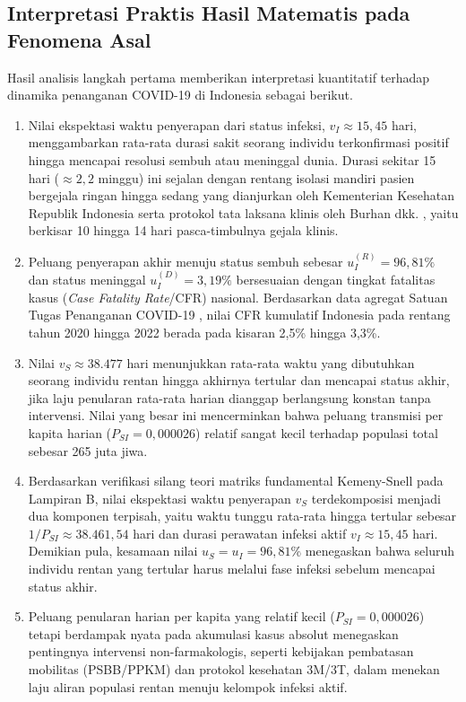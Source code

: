 \documentclass[12pt,a4paper]{article}
\numberwithin{equation}{section}
\begin{document}
\subsection{Interpretasi Praktis Hasil Matematis pada Fenomena Asal}
Hasil analisis langkah pertama memberikan interpretasi kuantitatif terhadap dinamika penanganan COVID-19 di Indonesia sebagai berikut.
\begin{enumerate}
  \item Nilai ekspektasi waktu penyerapan dari status infeksi, $v_I \approx 15{,}45$ hari, menggambarkan rata-rata durasi sakit seorang individu terkonfirmasi positif hingga mencapai resolusi sembuh atau meninggal dunia. Durasi sekitar 15 hari ($\approx 2{,}2$ minggu) ini sejalan dengan rentang isolasi mandiri pasien bergejala ringan hingga sedang yang dianjurkan oleh Kementerian Kesehatan Republik Indonesia \cite{kemenkes2020} serta protokol tata laksana klinis oleh Burhan dkk. \cite{burhan2020}, yaitu berkisar 10 hingga 14 hari pasca-timbulnya gejala klinis.
  \item Peluang penyerapan akhir menuju status sembuh sebesar $u_I^{(R)} = 96{,}81\%$ dan status meninggal $u_I^{(D)} = 3{,}19\%$ bersesuaian dengan tingkat fatalitas kasus (\textit{Case Fatality Rate}/CFR) nasional. Berdasarkan data agregat Satuan Tugas Penanganan COVID-19 \cite{satgascovid2022}, nilai CFR kumulatif Indonesia pada rentang tahun 2020 hingga 2022 berada pada kisaran 2,5\% hingga 3,3\%.
  \item Nilai $v_S \approx 38.477$ hari menunjukkan rata-rata waktu yang dibutuhkan seorang individu rentan hingga akhirnya tertular dan mencapai status akhir, jika laju penularan rata-rata harian dianggap berlangsung konstan tanpa intervensi. Nilai yang besar ini mencerminkan bahwa peluang transmisi per kapita harian ($P_{SI} = 0{,}000026$) relatif sangat kecil terhadap populasi total sebesar 265 juta jiwa.
  \item Berdasarkan verifikasi silang teori matriks fundamental Kemeny-Snell pada Lampiran B, nilai ekspektasi waktu penyerapan $v_S$ terdekomposisi menjadi dua komponen terpisah, yaitu waktu tunggu rata-rata hingga tertular sebesar $1/P_{SI} \approx 38.461{,}54$ hari dan durasi perawatan infeksi aktif $v_I \approx 15{,}45$ hari. Demikian pula, kesamaan nilai $u_S = u_I = 96{,}81\%$ menegaskan bahwa seluruh individu rentan yang tertular harus melalui fase infeksi sebelum mencapai status akhir.
  \item Peluang penularan harian per kapita yang relatif kecil ($P_{SI} = 0{,}000026$) tetapi berdampak nyata pada akumulasi kasus absolut menegaskan pentingnya intervensi non-farmakologis, seperti kebijakan pembatasan mobilitas (PSBB/PPKM) dan protokol kesehatan 3M/3T, dalam menekan laju aliran populasi rentan menuju kelompok infeksi aktif.

\end{enumerate}
\end{document}

